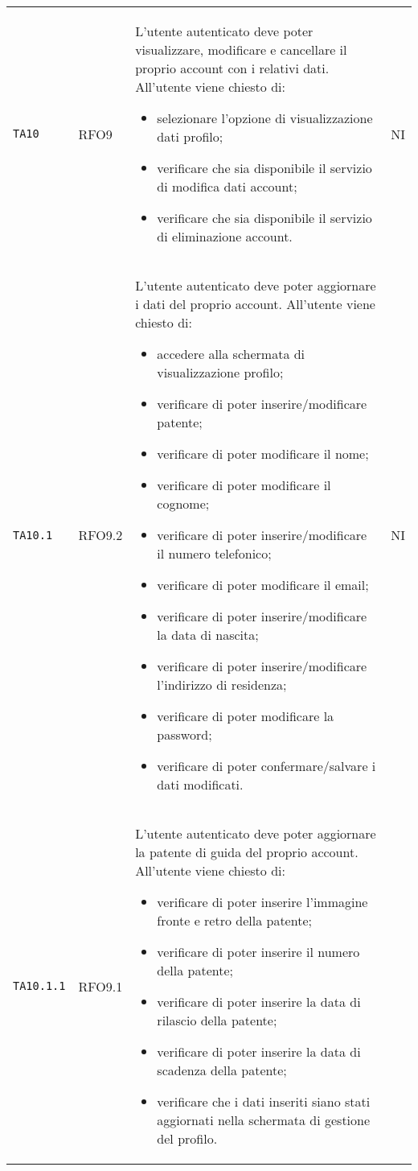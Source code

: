 \begin{longtable}{ >{\centering}p{} >{\centering}p{} >{\centering}p{}
			>{\centering}p{}}
		 \texttt{TA10}	& RFO9 & L'utente autenticato deve poter visualizzare, modificare e cancellare il proprio account con i relativi dati. All'utente viene chiesto di:
		 \begin{itemize}
		 	\item selezionare l'opzione di visualizzazione dati profilo;
		 	\item verificare che sia disponibile il servizio di modifica dati account;
		 	\item verificare che sia disponibile il servizio di eliminazione account.
		 \end{itemize}	&	NI	\tabularnewline
		 \texttt{TA10.1} & RFO9.2 & L'utente autenticato deve poter aggiornare i dati del proprio account. All'utente viene chiesto di:
		 \begin{itemize}
		 	\item accedere alla schermata di visualizzazione profilo;
		 	\item verificare di poter inserire/modificare patente;
		 	\item verificare di poter modificare il nome;
		 	\item verificare di poter modificare il cognome;
		 	\item verificare di poter inserire/modificare il numero telefonico;
		 	\item verificare di poter modificare il email;
		 	\item verificare di poter inserire/modificare la data di nascita;
		 	\item verificare di poter inserire/modificare l'indirizzo di residenza;
		 	\item verificare di poter modificare la password;
		 	\item verificare di poter confermare/salvare i dati modificati.
		 \end{itemize}	&	NI	\tabularnewline
		 \texttt{TA10.1.1}	& RFO9.1 & L'utente autenticato deve poter aggiornare la patente di guida del proprio account. All'utente viene chiesto di:
		 \begin{itemize}
		 	\item verificare di poter inserire l'immagine fronte e retro della patente;
		 	\item verificare di poter inserire il numero della patente;
		 	\item verificare di poter inserire la data di rilascio della patente;
		 	\item verificare di poter inserire la data di scadenza della patente;
		 	\item verificare che i dati inseriti siano stati aggiornati nella schermata di gestione del profilo.

\end{itemize}
\end{longtable}
